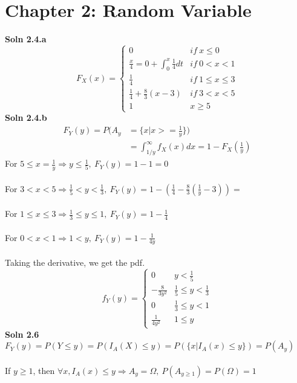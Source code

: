 \documentclass{article}
\newcommand{\SOL}[2]{%
  \textbf{Soln #1}\\%
}
\begin{document}
\section*{Chapter 2: Random Variable}
\SOL{2.4.a}
\\
$$ F_X(x) = 
	\begin{cases}
		0 & if\ x \leq 0 \\
		\frac{x}{4} = 0 + \int_0^x \frac{1}{4} dt & if\ 0 < x < 1 \\
		\frac{1}{4} & if\  1 \leq x \leq 3 \\
		\frac{1}{4} + \frac{8}{3}(x - 3) &  if\ 3 < x < 5 \\
		1 & x \geq 5
	\end{cases}
$$
\SOL{2.4.b}
\\
\begin{align*}
     F_Y(y) = P(A_y &= \{ x | x >= \frac{1}{y} \}) \\
      &= \int^\infty_{1/y} f_X(x)dx = 1 - F_X(\frac{1}{y})
\end{align*} 
For $5 \leq x= \frac{1}{y} \Rightarrow  y \leq \frac{1}{5},\ F_Y(y) = 1 - 1 = 0$ \\ \\
For $ 3 < x < 5 \Rightarrow  \frac{1}{5} < y < \frac{1}{3}, \ F_Y(y) = 1 - (\frac{1}{4} - \frac{8}{3}(\frac{1}{y} - 3)) = $ \\ \\ 
For $ 1 \leq x \leq 3 \Rightarrow \frac{1}{3} \leq y \leq 1, \ F_Y(y) = 1 - \frac{1}{4}$ \\ \\ 
For $0 < x < 1 \Rightarrow 1 < y, \ F_Y(y) = 1 - \frac{1}{4y}$ \\  \\
Taking the derivative, we get the pdf. \\
$$ f_Y(y) =
	\begin{cases}
		0 &  y < \frac{1}{5} \\
		- \frac{8}{3y^2} &  \frac{1}{5} \leq y < \frac{1}{3} \\
		0 &  \frac{1}{3} \leq y < 1 \\
		\frac{1}{4y^2} & 1 \leq y
	\end{cases}
$$
\SOL{2.6}
\\
$F_Y(y) = P( Y \leq y) = P( I_A(X) \leq y) = P(\{ x | I_A(x) \leq y \}) = P(A_y)$ \\ \\
If $y \geq 1$, then $\forall x, I_A(x) \leq y \Rightarrow A_y = \Omega, \ P(A_{y \geq 1}) = P(\Omega) = 1$ \\ \\
\end{document}
